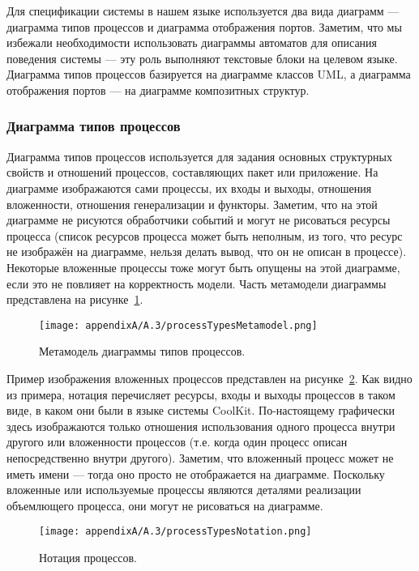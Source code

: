 Для спецификации системы в нашем языке используется два вида диаграмм --- диаграмма 
типов процессов и диаграмма отображения портов. Заметим, что мы избежали необходимости 
использовать диаграммы автоматов для описания поведения системы --- эту роль выполняют 
текстовые блоки на целевом языке. Диаграмма типов процессов базируется на диаграмме 
классов UML, а диаграмма отображения портов --- на диаграмме композитных структур.

\subsubsection{Диаграмма типов процессов}
Диаграмма типов процессов используется для задания основных структурных свойств и 
отношений процессов, составляющих пакет или приложение. На диаграмме изображаются сами 
процессы, их входы и выходы, отношения вложенности, отношения генерализации и функторы. 
Заметим, что на этой диаграмме не рисуются обработчики событий и могут не рисоваться 
ресурсы процесса (список ресурсов процесса может быть неполным, из того, что ресурс 
не изображён на диаграмме, нельзя делать вывод, что он не описан в процессе). Некоторые 
вложенные процессы тоже могут быть опущены на этой диаграмме, если это не повлияет 
на корректность модели. Часть метамодели диаграммы представлена на рисунке~\ref{image:processTypesMetamodel}.

\begin{figure} [ht]
	\begin{center}
		\texttt{[image: appendixA/A.3/processTypesMetamodel.png]}
		\caption{Метамодель диаграммы типов процессов.}
		\label{image:processTypesMetamodel}
	\end{center}
\end{figure}

Пример изображения вложенных процессов представлен на рисунке~\ref{image:processTypesNotation}. 
Как видно из примера, нотация перечисляет ресурсы, входы и выходы процессов в таком 
виде, в каком они были в языке системы CoolKit. По-настоящему графически здесь изображаются 
только отношения использования одного процесса внутри другого или вложенности процессов 
(т.е. когда один процесс описан непосредственно внутри другого). Заметим, что вложенный 
процесс может не иметь имени --- тогда оно просто не отображается на диаграмме. Поскольку 
вложенные или используемые процессы являются деталями реализации объемлющего процесса, 
они могут не рисоваться на диаграмме. 

\begin{figure} [ht]
	\begin{center}
		\texttt{[image: appendixA/A.3/processTypesNotation.png]}
		\caption{Нотация процессов.}
		\label{image:processTypesNotation}
	\end{center}
\end{figure}


